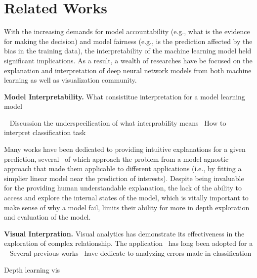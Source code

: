 
\section{Related Works}
With the increasing demands for model accountability (e.g., what is the evidence for making the decision) and model fairness (e.g., is the prediction affected by the bias in the training data),
the interpretability of the machine learning model held significant implications. As a result, a wealth of researches have be focused on the explanation and interpretation of deep neural network models from both machine learning as well as visualization community.

\noindent\textbf{Model Interpretability.}
What consistitue interpretation for a model learning model

~\cite{Doshi-Velez2017}
Discussion the underspecification of what interprability means~\cite{Lipton2016}
How to interpret classification task

Many works have been dedicated to providing intuitive explanations for a given prediction, several~\cite{RibeiroSinghGuestrin2016, KrausePererNg2016} of which approach the problem from a model agnostic approach that made them applicable to different applications (i.e., by fitting a simplier linear model near the prediction of interests).
%
Despite being invaluable for the providing human understandable explanation, the lack of the ability to access and explore the internal states of the model, which is vitally important to make sense of why a model fail, limits their ability for more in depth exploration and evaluation of the model.

\noindent\textbf{Visual Interpration.}
Visual analytics has demonstrate its effectiveness in the exploration of complex relationship. The application~\cite{TzengMa2005} has long been adopted for a
~\cite{KrausePererNg2016}
Several previous works~\cite{BilalJourablooYe2018} have dedicate to analyzing errors made in classification

Depth learning vis

